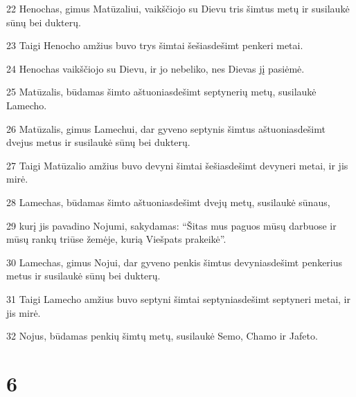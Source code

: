 \par 22 Henochas, gimus Matūzaliui, vaikščiojo su Dievu tris šimtus metų ir susilaukė sūnų bei dukterų. 
\par 23 Taigi Henocho amžius buvo trys šimtai šešiasdešimt penkeri metai. 
\par 24 Henochas vaikščiojo su Dievu, ir jo nebeliko, nes Dievas jį pasiėmė. 
\par 25 Matūzalis, būdamas šimto aštuoniasdešimt septynerių metų, susilaukė Lamecho. 
\par 26 Matūzalis, gimus Lamechui, dar gyveno septynis šimtus aštuoniasdešimt dvejus metus ir susilaukė sūnų bei dukterų. 
\par 27 Taigi Matūzalio amžius buvo devyni šimtai šešiasdešimt devyneri metai, ir jis mirė. 
\par 28 Lamechas, būdamas šimto aštuoniasdešimt dvejų metų, susilaukė sūnaus, 
\par 29 kurį jis pavadino Nojumi, sakydamas: “Šitas mus paguos mūsų darbuose ir mūsų rankų triūse žemėje, kurią Viešpats prakeikė”. 
\par 30 Lamechas, gimus Nojui, dar gyveno penkis šimtus devyniasdešimt penkerius metus ir susilaukė sūnų bei dukterų. 
\par 31 Taigi Lamecho amžius buvo septyni šimtai septyniasdešimt septyneri metai, ir jis mirė. 
\par 32 Nojus, būdamas penkių šimtų metų, susilaukė Semo, Chamo ir Jafeto.



\chapter{6}

